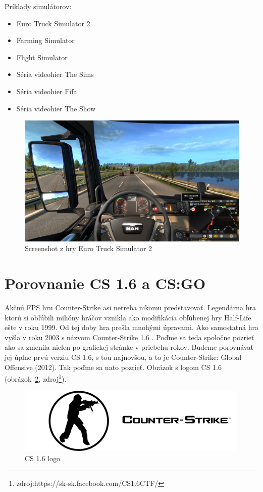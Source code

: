 \documentclass[10pt,oneside,slovak,a4paper]{article}
\begin{document}
Príklady simulátorov:
\begin{itemize}
\item Euro Truck Simulator 2
\item Farming Simulator
\item Flight Simulator
\item Séria videohier The Sims
\item Séria videohier Fifa
\item Séria videohier The Show
\end{itemize}

\begin{figure}[tbh]
\centering
\includegraphics[scale=0.15]{ets.jpg}
\caption{Screenshot z hry Euro Truck Simulator 2}
\label{f:ets2}
\end{figure}

\section{Porovnanie CS 1.6 a CS:GO} \label{porovnanie}

Akčnú FPS hru Counter-Strike asi netreba nikomu predstavovať. Legendárna hra ktorú si obľúbili milióny hráčov vznikla ako modifikácia obľúbenej hry Half-Life ešte v roku 1999. Od tej doby hra prešla mnohými úpravami. Ako samostatná hra vyšla v roku 2003 s názvom Counter-Strike 1.6 . Poďme sa teda spoločne pozrieť ako sa zmenila nielen po grafickej stránke v priebehu rokov. Budeme porovnávať jej úplne prvú verziu CS 1.6, s tou najnovšou, a to je Counter-Strike: Global Offensive (2012). Tak poďme sa nato pozrieť. Obrázok s logom CS 1.6 (obrázok~\ref{f:cs1.6}, zdroj\footnote{zdroj:https://sk-sk.facebook.com/CS1.6CTF/}).

\begin{figure}[tbh]
\centering
\includegraphics[scale=0.8]{cs16.png}
\caption{CS 1.6 logo}
\label{f:cs1.6}
\end{figure}
\end{document}

